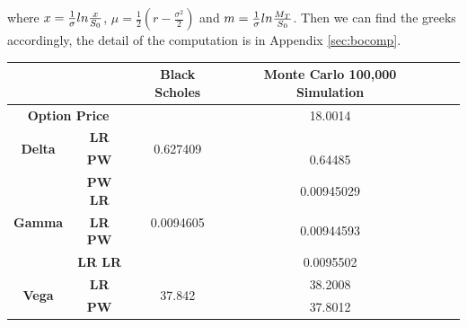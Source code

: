 \documentclass[11pt,a4paper,fleqn]{article}
\begin{document}
where $x = {1\over \sigma}ln {x\over S_0}$, $\mu=\frac{1}{2}(r-\frac{\sigma^2}{2})$ and $m = {1\over \sigma}ln {M_T\over S_0}$. Then we can find the greeks accordingly, the detail of the computation is in Appendix \ref{sec:bocomp}.\\


\begin{table} [h!]
\centering
\begin{subtable}{\textwidth}
  \centering
\begin{tabular}{|c|c|c|c|c|c|}
\hline
\multicolumn{2}{|l|}{}             & \textbf{Black Scholes} & \textbf{Monte Carlo 100,000 Simulation} \\ \hline
\multicolumn{2}{|c|}{\textbf{Option Price}}      &  & 18.0014          \\ \hline
\multirow{2}{*}{\textbf{Delta}} & \textbf{LR}    & \multirow{2}{*}{0.627409}                &      \\ 
                                & \textbf{PW}    &                                          & 0.64485               \\ \hline
\multirow{3}{*}{\textbf{Gamma}} & \textbf{PW LR} & \multirow{3}{*}{0.0094605}                 & 0.00945029       \\ 
                                & \textbf{LR PW} &                                           & 0.00944593       \\
                                & \textbf{LR LR} &                                          & 0.0095502        \\ \hline
\multirow{2}{*}{\textbf{Vega}}  & \textbf{LR}    & \multirow{2}{*}{37.842} & 38.2008          \\ 
                                & \textbf{PW}    &                                             & 37.8012          \\ \hline
\end{tabular}
\end{subtable}
\end{table}
\end{document}

